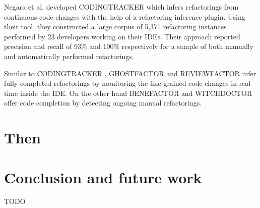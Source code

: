 \documentclass[letterpaper,12pt,onecolumn,final]{report}
\begin{document}
Negara et al. \cite{Negara2013} developed CODINGTRACKER which infers refactorings from continuous code changes with the help of a refactoring inference plugin. Using their tool, they constructed a large corpus of 5,371 refactoring instances performed by 23 developers working on their IDEs. Their approach reported precision and recall of 93\% and 100\% respectively for a sample of both manually and automatically performed refactorings.

Similar to CODINGTRACKER \cite{Negara2013}, GHOSTFACTOR \cite{Ge2014} and REVIEWFACTOR \cite{Ge2017} infer fully completed refactorings by monitoring the fine-grained code changes in real-time inside the IDE. On the other hand BENEFACTOR \cite{Ge2012} and WITCHDOCTOR \cite{Foster2012} offer code completion by detecting ongoing manual refactorings.


\chapter{Then}


\chapter{Conclusion and future work}
\label{chap:conclusion}

TODO


\clearpage
{}
{}  %
\singlespacing %





\appendix
\setcounter{table}{0}		%
\setcounter{figure}{0}		%
\renewcommand{\thefigure}{\Alph{chapter}.\arabic{figure}} 	%
\renewcommand{\thetable}{\Alph{chapter}.\arabic{table}}		%
\end{document}
